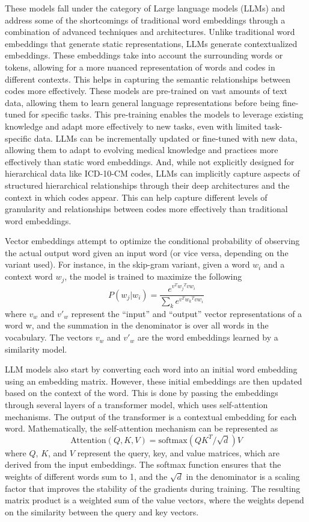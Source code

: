 \documentclass{bmcart}
\begin{document}
These models fall under the category of Large language models (LLMs) and
address some of the shortcomings of traditional 
word embeddings through a combination of advanced techniques and 
architectures. Unlike traditional word embeddings that generate static 
representations, LLMs generate contextualized embeddings. 
These embeddings take into account the surrounding words or tokens, allowing 
for a more nuanced representation of words and codes in different contexts. 
This helps in capturing the semantic relationships between codes more 
effectively. These models are pre-trained on vast amounts of text data, 
allowing them to learn general language representations before being 
fine-tuned for specific tasks. This pre-training enables the models to 
leverage existing knowledge and adapt more effectively to new tasks, even 
with limited task-specific data. LLMs can be incrementally 
updated or fine-tuned with new data, allowing them to adapt to evolving 
medical knowledge and practices more effectively than static word embeddings. 
And, while not explicitly designed for hierarchical data like ICD-10-CM codes, 
LLMs can implicitly capture aspects of structured hierarchical relationships through 
their deep architectures and the context in which codes appear. This can help 
capture different levels of granularity and relationships between codes more 
effectively than traditional word embeddings.

Vector embeddings attempt to optimize the conditional probability of observing 
the actual output word given an input word (or vice versa, depending on the 
variant used). For instance, in the skip-gram variant, given a word 
$w_i$ and a context word $w_j$, the model is trained to maximize the 
following
\begin{equation*}
P(w_j|w_i) = \frac{e^{v^T{w_j}^T v{w_i}}}{\sum_k e^{v^T{w_k}^T v{w_i}}}
\end{equation*}
where $v_w$ and $v'_w$ represent the ``input'' and ``output'' vector 
representations of a word w, and the summation in the denominator is over 
all words in the vocabulary. The vectors $v_w$ and $v'_w$ are the word 
embeddings learned by a similarity model.

LLM models also start by converting each word into an 
initial word embedding using an embedding matrix. However, these initial 
embeddings are then updated based on the context of the word. This is done by 
passing the embeddings through several layers of a transformer model, which 
uses self-attention mechanisms. The output of the transformer is a contextual 
embedding for each word. Mathematically, the self-attention mechanism can be 
represented as
\begin{equation*}
\text{Attention}(Q, K, V) = \text{softmax}(QK^T/\sqrt{d}) V
\end{equation*}
where $Q$, $K$, and $V$ represent the query, key, and value matrices, which 
are derived from the input embeddings. The softmax function ensures that the 
weights of different words sum to 1, and the $\sqrt{d}$ in the denominator is 
a scaling factor that improves the stability of the gradients during training. 
The resulting matrix product is a weighted sum of the value vectors, where the 
weights depend on the similarity between the query and key vectors.
\end{document}
